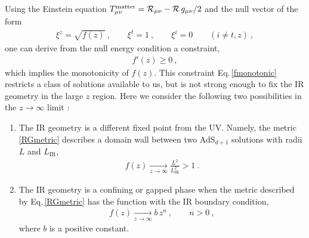 Using the Einstein equation $T_{\mu\nu}^\text{matter} = {\cal R}_{\mu\nu} - {\cal R}\, g_{\mu\nu}/2$ and the null vector of the form
\begin{align}\label{NVector}
\xi^z = \sqrt{f(z)} \ , \qquad \xi^t = 1 \ , \qquad \xi^i = 0 \qquad (i\neq t, z) \ ,
\end{align}
one can derive from the null energy condition a constraint,
\begin{align}\label{fmonotonic}
f'(z) \ge 0 \ ,
\end{align}
which implies the monotonicity of $f(z)$.
This constraint Eq.\,\eqref{fmonotonic} restricts a class of solutions available to us, but
is not strong enough to fix the IR geometry in the large $z$ region.
Here we consider the following two possibilities in the $z\to \infty$ limit \cite{Liu:2012eea}:
\begin{enumerate}
\item
The IR geometry is a different fixed point from the UV. 
Namely, the metric \eqref{RGmetric} describes a domain wall between two AdS$_{d+1}$ solutions with radii $L$ and $L_\text{IR}$,
\begin{align}\label{Domain}
f(z) \xrightarrow[z\to \infty]{} \frac{L^2}{L^2_\text{IR}} > 1\ .
\end{align}
\item
The IR geometry is a confining or gapped phase when the metric described by Eq.\,\eqref{RGmetric} has the function with the IR boundary condition,
\begin{align}\label{Gapped}
f(z) \xrightarrow[z\to \infty]{}  b\, z^n \ , \qquad n>0 \ ,
\end{align}
where $b$ is a positive constant.
\end{enumerate}



